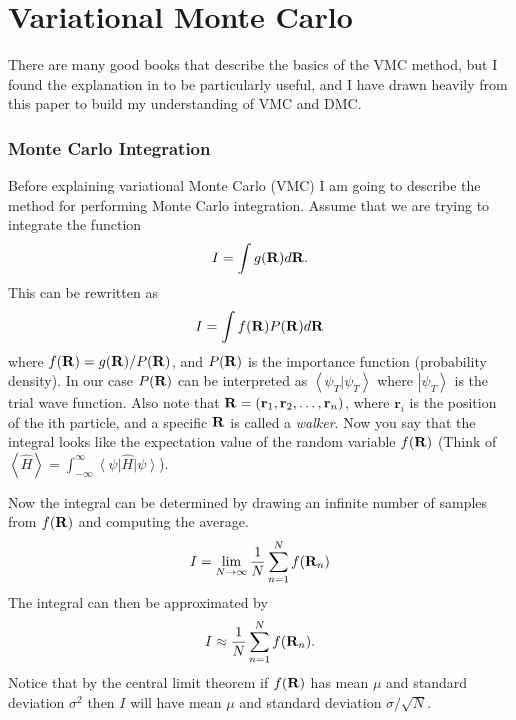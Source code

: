 \section*{Variational Monte Carlo}
There are many good books that describe the basics of the VMC method, but I found the explanation in \cite{foulkes2001} to be particularly useful, and I have drawn heavily from this paper to build my understanding of VMC and DMC.
\subsubsection*{Monte Carlo Integration}
Before explaining variational Monte Carlo (VMC) I am going to describe the method for performing Monte Carlo integration. Assume that we are trying to integrate the function
\begin{equation}
  I = \int g(\mathbf{R})d\mathbf{R}.
\end{equation}
This can be rewritten as
\begin{equation}
  I = \int f(\mathbf{R})P(\mathbf{R})d\mathbf{R}
\end{equation}
where $f(\mathbf{R})=g(\mathbf{R})/P(\mathbf{R})$, and $P(\mathbf{R})$ is the importance function (probability density). In our case $P(\mathbf{R})$ can be interpreted as $\left<\psi_T|\psi_T\right>$ where $\left|\psi_T\right>$ is the trial wave function. Also note that $\mathbf{R}=(\mathbf{r}_1, \mathbf{r}_2, \ldots, \mathbf{r}_n)$, where $\mathbf{r}_i$ is the position of the ith particle, and a specific $\mathbf{R}$ is called a {\it walker}. Now you say that the integral looks like the expectation value of the random variable $f(\mathbf{R})$ (Think of $\left< \hat{H} \right> = \int_{-\infty}^{\infty} \left<\psi\right|\hat{H}\left|\psi\right>$).

Now the integral can be determined by drawing an infinite number of samples from $f(\mathbf{R})$ and computing the average.
\begin{equation}
  I = \lim_{N \to \infty} \frac{1}{N}\sum\limits_{n=1}^N f(\mathbf{R}_n)
\end{equation}
The integral can then be approximated by
\begin{equation}
  I \approx \frac{1}{N} \sum\limits_{n=1}^N f(\mathbf{R}_n).
\end{equation}
Notice that by the central limit theorem if $f(\mathbf{R})$ has mean $\mu$ and standard deviation $\sigma^2$ then $I$ will have mean $\mu$ and standard deviation $\sigma/\sqrt{N}$.

